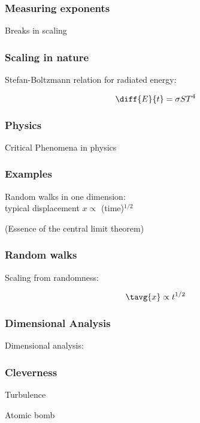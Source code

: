 \begin{frame}
  \frametitle{Measuring exponents}

Breaks in scaling


\end{frame}

\begin{frame}
  \frametitle{Scaling in nature}

Stefan-Boltzmann relation for radiated energy:

$$\diff{E}{t} = \sigma S T^4$$


\end{frame}

\begin{frame}
  \frametitle{Physics}

Critical Phenomena in physics


\end{frame}

\begin{frame}
  \frametitle{Examples}

Random walks in one dimension:\\
typical displacement $x \propto$ (time)$^{1/2}$


(Essence of the central limit theorem)



\end{frame}

\begin{frame}
  \frametitle{Random walks}

Scaling from randomness:



$$\tavg{x} \propto t^{1/2}$$


\end{frame}

\begin{frame}
  \frametitle{Dimensional Analysis}

Dimensional analysis:

\end{frame}

\begin{frame}
  \frametitle{Cleverness}

Turbulence

Atomic bomb

\end{frame}

